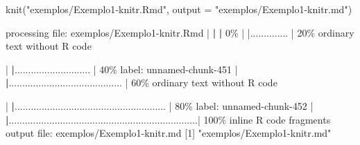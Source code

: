 \documentclass[
  10pt,
  a4paper]{book}
\newenvironment{Shaded}{\begin{snugshade}}{\end{snugshade}}
\newcommand{\AttributeTok}[1]{\textcolor[rgb]{0.77,0.63,0.00}{#1}}
\newcommand{\DecValTok}[1]{\textcolor[rgb]{0.00,0.00,0.81}{#1}}
\newcommand{\ErrorTok}[1]{\textcolor[rgb]{0.64,0.00,0.00}{\textbf{#1}}}
\newcommand{\FunctionTok}[1]{\textcolor[rgb]{0.00,0.00,0.00}{#1}}
\newcommand{\NormalTok}[1]{#1}
\newcommand{\SpecialCharTok}[1]{\textcolor[rgb]{0.00,0.00,0.00}{#1}}
\newcommand{\StringTok}[1]{\textcolor[rgb]{0.31,0.60,0.02}{#1}}
\begin{document}
\begin{Shaded}
\begin{Highlighting}[]
\FunctionTok{knit}\NormalTok{(}\StringTok{"exemplos/Exemplo1{-}knitr.Rmd"}\NormalTok{, }\AttributeTok{output =} \StringTok{"exemplos/Exemplo1{-}knitr.md"}\NormalTok{)}


\NormalTok{processing file}\SpecialCharTok{:}\NormalTok{ exemplos}\SpecialCharTok{/}\NormalTok{Exemplo1}\SpecialCharTok{{-}}\NormalTok{knitr.Rmd}
  \SpecialCharTok{|}                                                                              \ErrorTok{|}                                                                      \ErrorTok{|}   \DecValTok{0}\SpecialCharTok{\%  |                                                                              |..............                                                        |  20\%}
\NormalTok{  ordinary text without R code}

  \SpecialCharTok{|}                                                                              \ErrorTok{|}\NormalTok{............................                                          }\SpecialCharTok{|}  \DecValTok{40}\NormalTok{\%}
\NormalTok{label}\SpecialCharTok{:}\NormalTok{ unnamed}\SpecialCharTok{{-}}\NormalTok{chunk}\DecValTok{{-}451}
  \SpecialCharTok{|}                                                                              \ErrorTok{|}\NormalTok{..........................................                            }\SpecialCharTok{|}  \DecValTok{60}\NormalTok{\%}
\NormalTok{  ordinary text without R code}

  \SpecialCharTok{|}                                                                              \ErrorTok{|}\NormalTok{........................................................              }\SpecialCharTok{|}  \DecValTok{80}\NormalTok{\%}
\NormalTok{label}\SpecialCharTok{:}\NormalTok{ unnamed}\SpecialCharTok{{-}}\NormalTok{chunk}\DecValTok{{-}452}
  \SpecialCharTok{|}                                                                              \ErrorTok{|}\NormalTok{......................................................................}\SpecialCharTok{|} \DecValTok{100}\NormalTok{\%}
\NormalTok{   inline R code fragments}
\NormalTok{output file}\SpecialCharTok{:}\NormalTok{ exemplos}\SpecialCharTok{/}\NormalTok{Exemplo1}\SpecialCharTok{{-}}\NormalTok{knitr.md}
\NormalTok{[}\DecValTok{1}\NormalTok{] }\StringTok{"exemplos/Exemplo1{-}knitr.md"}
\end{Highlighting}
\end{Shaded}
\end{document}
